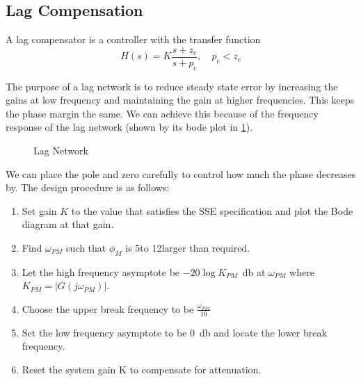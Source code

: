 \subsection{Lag Compensation}
\begin{definition}
  A lag compensator is a controller with the transfer function
  \[
	H(s) = K \frac{s+z_c}{s+p_c},\quad p_c < z_c
  \]
  \label{defn:lag-network}
\end{definition}
The purpose of a lag network is to reduce steady state error by increasing the gains at low frequency and maintaining the gain at higher frequencies. This keeps the phase margin the same.
We can achieve this because of the frequency response of the lag network (shown by its bode plot in \cref{fig:lag-network}).

\begin{figure}
  \centering
  \caption{Lag Network}
  \label{fig:lag-network}
\end{figure}
We can place the pole and zero carefully to control how much the phase decreases by. The design procedure is as follows:
\begin{enumerate}
  \item Set gain $K$ to the value that satisfies the SSE specification and plot the Bode diagram at that gain.
  \item Find $\omega_{PM}$ such that $\phi_M$ is 5\textdegree  to 12\textdegree  larger than required.
  \item Let the high frequency asymptote be $-20\log K_{PM}$\SI{}{\decibel} at $\omega_{PM}$ where $K_{PM} = |G(j\omega_{PM})|$.
  \item Choose the upper break frequency to be $\frac{\omega_{PM}}{10}$
  \item Set the low frequency asymptote to be \SI{0}{\decibel} and locate the lower break frequency.
  \item Reset the system gain K to compensate for attenuation.
\end{enumerate}
